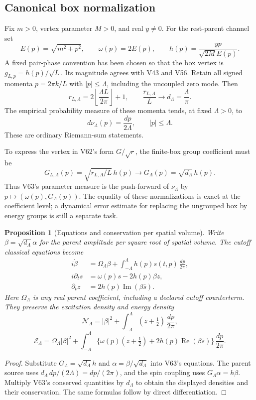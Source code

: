 \documentclass[11pt]{article}
\newtheorem{proposition}[theorem]{Proposition}
\theoremstyle{remark}
\begin{document}
\subsection{Canonical box normalization}

Fix \(m>0\), vertex parameter \(M>0\), and real \(y\ne0\).
For the rest-parent channel set
\[
 E(p)=\sqrt{m^2+p^2},\qquad \omega(p)=2E(p),\qquad
 h(p)=\frac{yp}{\sqrt{2M}E(p)}.
\]
A fixed pair-phase convention has been chosen so that the
box vertex is \(g_{L,p}=h(p)/\sqrt L\).
Its magnitude agrees with V43 and V56.  Retain all signed
momenta \(p=2\pi k/L\) with \(|p|\leq\Lambda\), including
the uncoupled zero mode.  Then
\[
 r_{L,\Lambda}=2\left\lfloor\frac{\Lambda L}{2\pi}\right\rfloor+1,
 \qquad
 \frac{r_{L,\Lambda}}L\longrightarrow
                         d_\Lambda=\frac{\Lambda}{\pi}.
\]
The empirical probability measure of these momenta tends,
at fixed \(\Lambda>0\), to
\[
 d\nu_\Lambda(p)=\frac{dp}{2\Lambda},\qquad |p|\leq\Lambda .
\]
These are ordinary Riemann-sum statements.

To express the vertex in V62's form \(G/\sqrt r\),
the finite-box group coefficient must be
\[
 G_{L,\Lambda}(p)=\sqrt{r_{L,\Lambda}/L}\,h(p)
       \longrightarrow G_\Lambda(p)=\sqrt{d_\Lambda}\,h(p).
\]
Thus V63's parameter measure is the push-forward of
\(\nu_\Lambda\) by
\(p\mapsto(\omega(p),G_\Lambda(p))\).
The equality of these normalizations is exact at the
coefficient level; a dynamical error estimate for replacing
the ungrouped box by energy groups is still a separate task.

\begin{proposition}[Equations and conservation per spatial volume]
\label{prop:v20v64-volume}
Write \(\beta=\sqrt{d_\Lambda}\alpha\) for the
parent amplitude per square root of spatial volume.
The cutoff classical equations become
\[
 \begin{aligned}
 i\dot\beta&=\Omega_\Lambda\beta+
           \int_{-\Lambda}^{\Lambda}h(p)s(t,p)\,\frac{dp}{2\pi},\\
 i\partial_t s&=\omega(p)s-2h(p)\beta z,\\
 \partial_t z&=2h(p)\operatorname{Im}(\beta\overline s).
 \end{aligned}
\]
Here \(\Omega_\Lambda\) is any real parent coefficient,
including a declared cutoff counterterm.
They preserve the excitation density and energy density
\[
 \mathcal N_\Lambda=|\beta|^2+
          \int_{-\Lambda}^{\Lambda}(z+\tfrac12)\,\frac{dp}{2\pi},
\]
\[
 \mathcal E_\Lambda=\Omega_\Lambda|\beta|^2+
  \int_{-\Lambda}^{\Lambda}
  \{\omega(p)(z+\tfrac12)+
              2h(p)\operatorname{Re}(\beta\overline s)\}\,\frac{dp}{2\pi}.
\]
\end{proposition}
\begin{proof}
Substitute \(G_\Lambda=\sqrt{d_\Lambda}h\) and
\(\alpha=\beta/\sqrt{d_\Lambda}\) into V63's equations.
The parent source uses
\(d_\Lambda\,dp/(2\Lambda)=dp/(2\pi)\), and the spin
coupling uses \(G_\Lambda\alpha=h\beta\).
Multiply V63's conserved quantities by \(d_\Lambda\)
to obtain the displayed densities and their conservation.
The same formulas follow by direct differentiation.
\end{proof}
\end{document}

